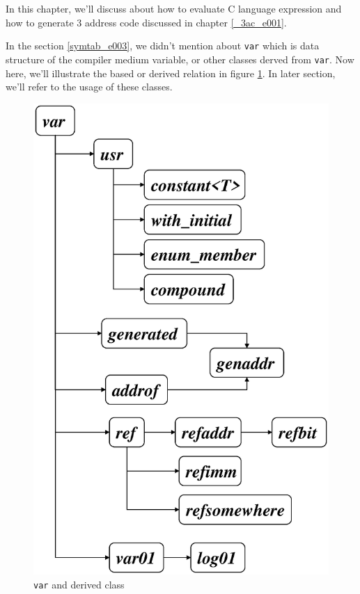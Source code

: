 \label{expr_e000}
In this chapter, we'll discuss about how to evaluate
C language expression and how to generate 3 address code
discussed in chapter \ref{_3ac_e001}.

In the section \ref{symtab_e003}, we didn't mention about {\tt{var}} 
which is data structure of the compiler medium variable, or other
classes derved from {\tt{var}}. Now here, we'll illustrate
the based or derived relation in figure \ref{expr_e013}.
In later section, we'll refer to the usage of these classes.

\begin{figure}[htbp]
\begin{center}
\includegraphics[width=1.0\linewidth,height=1.5\linewidth]{var.eps}
\caption{{\tt{var}} and derived class}
\label{expr_e013}
\end{center}
\end{figure}

